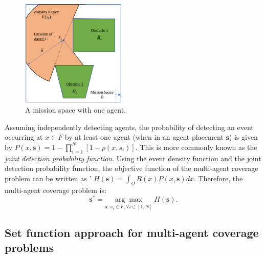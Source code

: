 \documentclass[conference]{IEEEtran}
\begin{document}
\begin{figure}[!h]
    \centering
    \includegraphics[width=2in]{Figures/Geometry.png}
    \caption{A mission space with one agent.}
    \label{Fig:Geometry}
\end{figure}

Assuming independently detecting agents, the probability of detecting an event occurring at $x \in F$ by at least one agent (when in an agent placement $\textbf{s}$) is given by $P(x,\textbf{s}) = 1-\prod_{i=1}^N \left[ 1-p(x,s_i) \right]$. This is more commonly known as the \emph{joint detection probability function}. Using the event density function and the joint detection probability function, the objective function of the multi-agent coverage problem can be written as '
$H(\textbf{s}) = \int_\Omega R(x)P(x,\textbf{s})dx$. Therefore, the multi-agent coverage problem is:
\begin{equation}\label{Eq:CoverageProblem}
    \textbf{s}^* = \underset{\textbf{s}:\, s_i \in F, \forall i\in [1,N]}{\arg\max}\ H(\textbf{s}).
\end{equation}


\subsection{Set function approach for multi-agent coverage problems}
\end{document}
